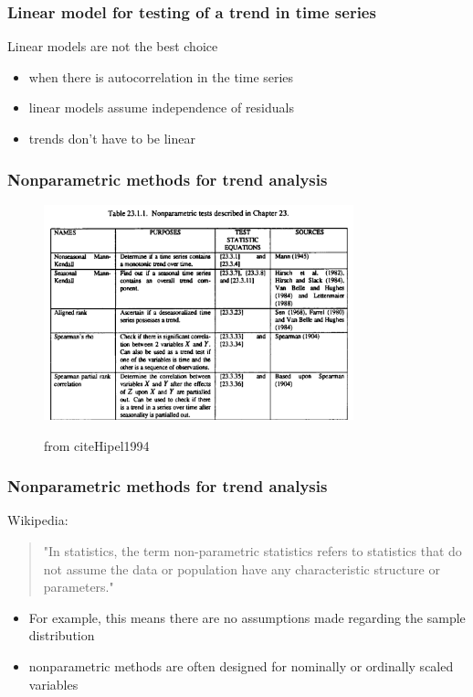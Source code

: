 \documentclass[xcolor=table, xcolor=dvipsnames]{beamer}\usepackage[]{graphicx}\usepackage[]{color}
\begin{document}

\begin{frame}[fragile]\frametitle{Linear model for testing of a trend in time series}
Linear models are not the best choice
\begin{itemize}
\item when there is autocorrelation in the time series
\item linear models assume independence of residuals
\item trends don't have to be linear 
\end{itemize}
\end{frame}


\begin{frame}\frametitle{Nonparametric methods for trend analysis}
\begin{figure}[H]
\includegraphics[width=0.8\textwidth]{externalfig/nonparametrictrend_tab_hipel94.png}\\
\begin{flushright}\tiny{from cite{Hipel1994}}\end{flushright} %
\end{figure}
\end{frame}


\begin{frame}\frametitle{Nonparametric methods for trend analysis}
Wikipedia:
\begin{quote}
"In statistics, the term non-parametric statistics refers to statistics that do not assume the data or population have any characteristic structure or parameters."
\end{quote}
\begin{itemize}
\item{For example, this means there are no assumptions made regarding the sample distribution}
\item nonparametric methods are often designed for nominally or ordinally scaled variables
\end{itemize}
\end{frame}
\end{document}

